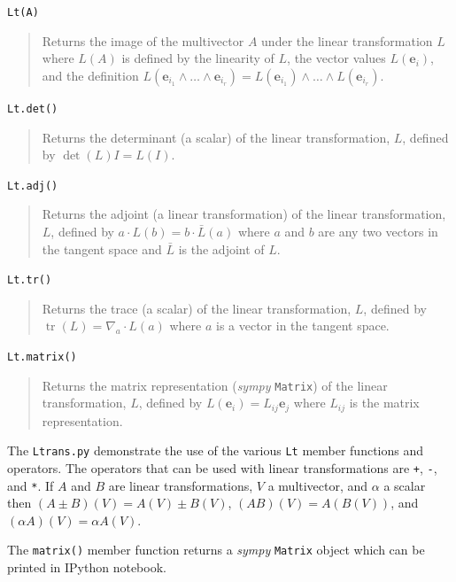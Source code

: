 \documentclass[12pt,twoside,openright]{memoir}
\newcommand{\bm}[1]{\boldsymbol{#1}}
\newcommand{\ebf}{\bm{e}}
\newcommand{\lp}{\left (}
\newcommand{\rp}{\right )}
\newcommand{\W}{\wedge}
\newcommand{\f}[2]{{#1}\lp {#2} \rp}
\newcommand{\paren}[1]{\lp {#1} \rp}
\newcommand{\T}[1]{\texttt{#1}}
\begin{document}
\T{Lt(A)}
\begin{quote}
	Returns the image of the multivector $A$ under the linear transformation $L$ where $\f{L}{A}$ is defined by the
	linearity of $L$, the vector values $\f{L}{\ebf_{i}}$, and the definition
	$\f{L}{\ebf_{i_{1}}\W\dots\W\ebf_{i_{r}}} = \f{L}{\ebf_{i_{1}}}\W\dots\W\f{L}{\ebf_{i_{r}}}$. 
\end{quote}
\T{Lt.det()}
\begin{quote}
	Returns the determinant (a scalar) of the linear transformation, $L$, defined by $\f{\det}{L}I = \f{L}{I}$.
\end{quote}
\T{Lt.adj()}
\begin{quote}
	Returns the adjoint (a linear transformation) of the linear transformation, $L$, defined by $a\cdot\f{L}{b} = b\cdot\f{\bar{L}}{a}$ where
	$a$ and $b$ are any two vectors in the tangent space and $\bar{L}$ is the adjoint of $L$.
\end{quote}
\T{Lt.tr()}
\begin{quote}
	Returns the trace (a scalar) of the linear transformation, $L$, defined by 
	$\f{\operatorname{tr}}{L}=\nabla_{a}\cdot\f{L}{a}$ where $a$ is a vector in the tangent space.
\end{quote}
\T{Lt.matrix()}
\begin{quote}
	Returns the matrix representation (\emph{sympy} \T{Matrix}) of the linear transformation, $L$, defined by 
	$\f{L}{\ebf_{i}} = L_{ij}\ebf_{j}$ where $L_{ij}$ is the matrix representation.
\end{quote}
The \T{Ltrans.py} demonstrate the use of the various \T{Lt} member functions and operators. The operators that can be used with
linear transformations are \T{+}, \T{-}, and \T{*}. If $A$ and $B$ are linear transformations, $V$ a multivector, and $\alpha$ a 
scalar then $\f{\paren{A\pm B}}{V} = \f{A}{V}\pm\f{B}{V}$, $\f{\paren{AB}}{V} = \f{A}{\f{B}{V}}$, and 
$\f{\paren{\alpha A}}{V} = \alpha\f{A}{V}$.

The \T{matrix()} member function returns a \emph{sympy} \T{Matrix} object which can be printed in IPython notebook.
\end{document}
